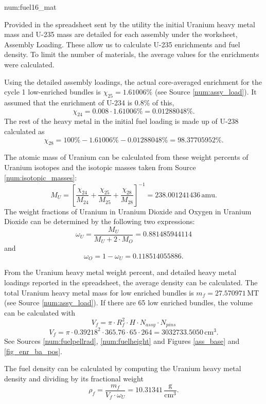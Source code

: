 \begin{numitem}{num:fuel16_mat}
  
   Provided in the spreadsheet sent by the utility the initial Uranium heavy metal mass and U-235 mass are detailed for each assembly under the worksheet, Assembly Loading. These allow us to calculate U-235 enrichments and fuel density. To limit the number of materials, the average values for the enrichments were calculated. 
   
   Using the detailed assembly loadings, the actual core-averaged enrichment for the cycle 1 low-enriched bundles is $\chi_{25} = 1.61006\%$ (see Source \ref{num:assy_load}). It assumed that the enrichment of U-234 is 0.8\% of this,
\[
    \chi_{24} = 0.008\cdot 1.61006\% = 0.01288048\%.
\]
    The rest of the heavy metal in the initial fuel loading is made up of U-238 calculated as
\[
    \chi_{28} = 100\% - 1.61006\% - 0.01288048\% = 98.37705952\%.
\]

The atomic mass of Uranium can be calculated from these weight percents of Uranium isotopes and the isotopic masses taken from Source \ref{num:isotopic_masses}:
\[
    M_U = \left[ \frac{\chi_{24}}{M_{24}} + \frac{\chi_{25}}{M_{25}} + \frac{\chi_{28}}{M_{28}} \right ]^{-1} = 238.001241436\,\mathrm{amu}. 
\]
The weight fractions of Uranium in Uranium Dioxide and Oxygen in Uranium Dioxide can be determined by the following two expressions:
\[
    \omega_{U} = \frac{M_U}{M_U + 2\cdot M_O} = 0.881485944114
\]
and
\[
    \omega_{O} = 1 - \omega_{U} = 0.118514055886.
\]

From the Uranium heavy metal weight percent, and detailed heavy metal loadings reported in the spreadsheet, the average density can be calculated. The total Uranium heavy metal mass for low enriched bundles is $m_f = 27.570971\,\mathrm{MT}$ (see Source \ref{num:assy_load}).  If there are 65 low enriched bundles, the volume can be calculated with
\[
    V_f = \pi \cdot R_f^2 \cdot H \cdot N_{assy} \cdot N_{pins}
\]
\[
    V_f = \pi \cdot 0.39218^2 \cdot 365.76 \cdot 65 \cdot 264 = 3032733.5050\,\mathrm{cm^3}.
\]
See Sources \ref{num:fuelpellrad}, \ref{num:fuelheight} and Figures \ref{ass_base} and \ref{fig_enr_ba_pos}.

The fuel density can be calculated by computing the Uranium heavy metal density and dividing by its fractional weight
\[
    \rho_f = \frac{m_f}{V_f\cdot\omega_{U}} = 10.31341\,\mathrm{\frac{g}{cm^3}}.
\]


\end{numitem}

